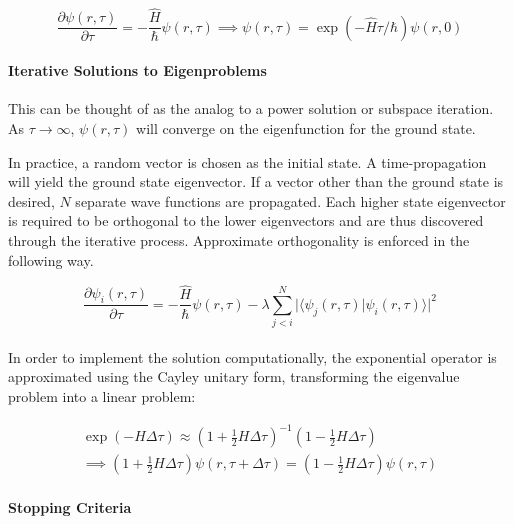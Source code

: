 \documentclass[12pt,]{book}
\let\oldparagraph\paragraph
\renewcommand{\paragraph}[1]{\oldparagraph{#1}\mbox{}}
\begin{document}
\begin{equation}
\label{eq:itpSch}
\frac{\partial \psi(r,\tau)}{\partial
\tau}=-\frac{\hat{H}}{\hbar}\psi(r,\tau) \implies \psi(r,\tau)=\exp(-\hat{H}\tau/\hbar)\psi(r,0)
\end{equation}

\paragraph{Iterative Solutions to Eigenproblems}

This can be thought of as the analog to a power solution or subspace
iteration. As \(\tau\to\infty\), \(\psi(r,\tau)\) will converge on the
eigenfunction for the ground state.

In practice, a random vector is chosen as the initial state. A
time-propagation will yield the ground state eigenvector. If a vector
other than the ground state is desired, \(N\) separate wave functions
are propagated. Each higher state eigenvector is required to be
orthogonal to the lower eigenvectors and are thus discovered through the
iterative process. Approximate orthogonality is enforced in the
following way.

\begin{equation}
\label{eq:appxOrth}
\frac{\partial\psi_i(r,\tau)}{\partial\tau} = -\frac{\hat{H}}{\hbar}\psi(r,\tau)-\lambda\sum_{j < i}^N \rvert\langle \psi_j(r,\tau)\rvert\psi_i(r,\tau)\rangle\rvert^2
\end{equation}

\paragraph{}

In order to implement the solution computationally, the exponential
operator is approximated using the Cayley unitary form, transforming the
eigenvalue problem into a linear problem:

\begin{align*}
\label{eq:CayleyExpansion}
\exp(-H\Delta\tau)\approx\left(1+\frac{1}{2}H\Delta\tau\right)^{-1}\left(1-\frac{1}{2}H\Delta\tau\right) \\ 
\implies \left(1+\frac{1}{2}H\Delta\tau\right)\psi(r,\tau+\Delta\tau)=\left(1-\frac{1}{2}H\Delta\tau\right)\psi(r,\tau)
\end{align*}

\paragraph{Stopping Criteria}
\end{document}
